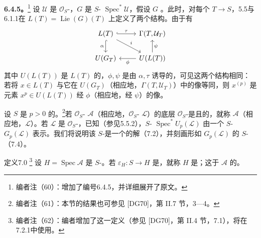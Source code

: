 \textbf{6.4.5。}\footnote{编者注（60）：增加了编号6.4.5，并详细展开了原文。}
设 $\mathcal U$ 是 $\mathcal O_S$-，$G$ 是 $S$- $\operatorname{Spec}^*\mathcal U$，假设 $G$ 。此时，对每个 $T\to S$，5.5与6.1.1在 $L(T)=\operatorname{Lie}(G)(T)$ 上定义了两个结构。由于有
\[
\begin{tikzcd}
 L(T)\arrow[r,hook,"\tau"]\arrow[d,hook,"\alpha"']\arrow[dr,"i"]&\Gamma(T,\mathcal U_T)\\
 U(G_T)&U(L(T))\arrow[l,"\phi"]\arrow[u,"\psi"']
\end{tikzcd}
\]
其中 $U(L(T))$ 是 $L(T)$ 的，$\phi,\psi$ 是由 $\alpha,\tau$ 诱导的，可见这两个结构相同：若将 $x\in L(T)$ 与它在 $U(G_T)$（相应地，$\Gamma(T,\mathcal U_T)$）中的像等同，则 $x^{(p)}$ 是元素 $x^p\in U(L(T))$ 经 $\phi$（相应地，经 $\psi$）的像。

设 $S$ 是 $p>0$ 的。\footnote{编者注（61）：本节的结果也可参见 [DG70]，第 II.7 节，3—4。}若 $\mathcal O_S$- $\mathcal A$（相应地，$\mathcal O_S$- $\mathcal L$）的底层 $\mathcal O_S$-是且的，就称 $\mathcal A$（相应地，$\mathcal L$）。若 $\mathcal L$ 是 $\mathcal O_S$-，已知（参见5.5.2），$S$- $\operatorname{Spec}^*U_p(\mathcal L)$ 由一个 $S$- $G_p(\mathcal L)$ 表示。我们将说明该 $S$-是一个的解（7.2），并刻画形如 $G_p(\mathcal L)$ 的 $S$-（7.4）。

\begin{SGAresult}{定义}{7.0}
\footnote{编者注（62）：编者增加了这一定义（参见 [DG70]，第 II.4 节，7.1），将在7.2.1中使用。}
设 $H=\operatorname{Spec}\mathcal A$ 是 $S$-。若 $\varepsilon_H:S\to H$ 是，就称 $H$ 是；这于 $\mathcal A$ 的。
\end{SGAresult}

